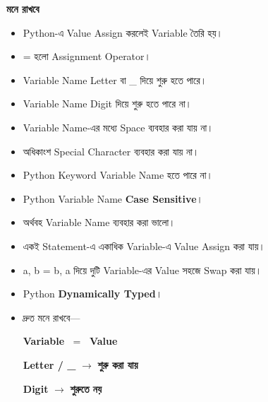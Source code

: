 
\begin{rememberbox}

\textbf{\color{deepOrange}মনে রাখবে}

\begin{itemize}

\item
Python-এ Value Assign করলেই Variable তৈরি হয়।

\item
\textenglish{\ttfamily =}
হলো Assignment Operator।

\item
Variable Name Letter বা
\textenglish{\ttfamily \_}
দিয়ে শুরু হতে পারে।

\item
Variable Name Digit দিয়ে শুরু হতে পারে না।

\item
Variable Name-এর মধ্যে Space ব্যবহার করা যায় না।

\item
অধিকাংশ Special Character ব্যবহার করা যায় না।

\item
Python Keyword Variable Name হতে পারে না।

\item
Python Variable Name
\textbf{Case Sensitive}।

\item
অর্থবহ Variable Name ব্যবহার করা ভালো।

\item
একই Statement-এ একাধিক Variable-এ Value Assign করা যায়।

\item
\textenglish{\ttfamily a, b = b, a}
দিয়ে দুটি Variable-এর Value সহজে Swap করা যায়।

\item
Python
\textbf{Dynamically Typed}।

\item
দ্রুত মনে রাখবে—

\begin{center}

\textbf{Variable}
\(\;=\;\)
\textbf{Value}

\medskip

\textbf{Letter / \textenglish{\ttfamily \_}}
\(\longrightarrow\)
\textbf{শুরু করা যায়}

\qquad

\textbf{Digit}
\(\longrightarrow\)
\textbf{শুরুতে নয়}


\end{center}
\end{itemize}
\end{rememberbox}
